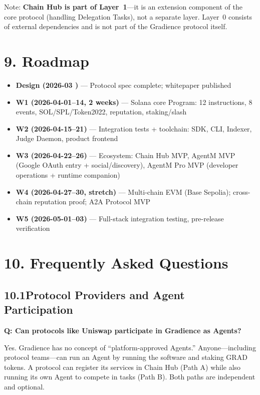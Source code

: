 \documentclass[11pt,a4paper]{article}
\begin{document}
Note: \textbf{Chain Hub is part of Layer~1}---it is an extension component of the core protocol (handling Delegation Tasks), not a separate layer. Layer~0 consists of external dependencies and is not part of the Gradience protocol itself.

\section{9. Roadmap}

\begin{itemize}[nosep]
  \item \textbf{Design (2026-03 \checkmark)} --- Protocol spec complete; whitepaper published
  \item \textbf{W1 (2026-04-01--14, 2 weeks)} --- Solana core Program: 12 instructions, 8 events, SOL/SPL/Token2022, reputation, staking/slash
  \item \textbf{W2 (2026-04-15--21)} --- Integration tests + toolchain: SDK, CLI, Indexer, Judge Daemon, product frontend
  \item \textbf{W3 (2026-04-22--26)} --- Ecosystem: Chain Hub MVP, AgentM MVP (Google OAuth entry + social/discovery), AgentM Pro MVP (developer operations + runtime companion)
  \item \textbf{W4 (2026-04-27--30, stretch)} --- Multi-chain EVM (Base Sepolia); cross-chain reputation proof; A2A Protocol MVP
  \item \textbf{W5 (2026-05-01--03)} --- Full-stack integration testing, pre-release verification
\end{itemize}

\section{10. Frequently Asked Questions}

\subsection{10.1\quad Protocol Providers and Agent Participation}

\textbf{Q: Can protocols like Uniswap participate in Gradience as Agents?}

Yes. Gradience has no concept of ``platform-approved Agents.'' Anyone---including protocol teams---can run an Agent by running the software and staking GRAD tokens. A protocol can register its services in Chain Hub (Path A) while also running its own Agent to compete in tasks (Path B). Both paths are independent and optional.
\end{document}
